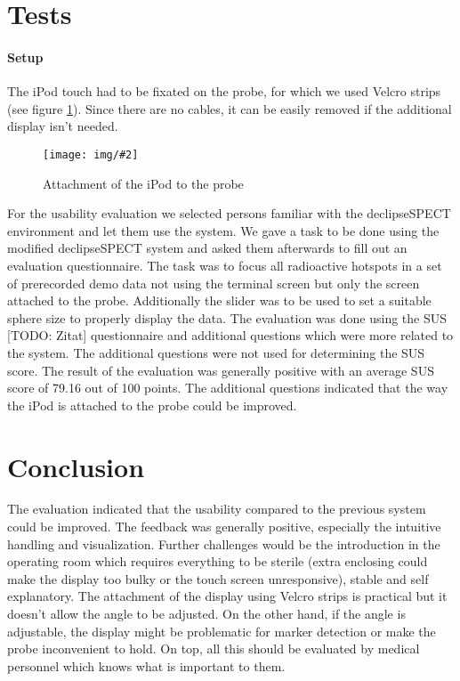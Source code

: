 \documentclass{scrartcl}
\newcommand{\graphic}[3][width=\linewidth] %
{
  \begin{figure}[h!t]
    \centering
    \texttt{[image: img/\#2]}
    \caption{#3}
    \label{fig:#2}
  \end{figure}
}
\newcommand{\refFigure}[1]{figure \ref{fig:#1}}
\begin{document}
\section{Tests}
\paragraph*{Setup}
The iPod touch had to be fixated on the probe, for which we used Velcro strips (see \refFigure{probe}). Since there are no cables, it can be easily removed if the additional display isn't needed.
\graphic[scale=.5]{probe}{Attachment of the iPod to the probe}

For the usability evaluation we selected persons familiar with the declipseSPECT environment and let them use the system. We gave a task to be done using the modified declipseSPECT system and asked them afterwards to fill out an evaluation questionnaire.
The task was to focus all radioactive hotspots in a set of prerecorded demo data not using the terminal screen but only the screen attached to the probe. Additionally the slider was to be used to set a suitable sphere size to properly display the data. The evaluation was done using the SUS [TODO: Zitat] questionnaire and additional questions which were more related to the system. The additional questions were not used for determining the SUS score.
The result of the evaluation was generally positive with an average SUS score of 79.16 out of 100 points. The additional questions indicated that the way the iPod is attached to the probe could be improved.



\section{Conclusion}
The evaluation indicated that the usability compared to the previous system could be improved. The feedback was generally positive, especially the intuitive handling and visualization.
Further challenges would be the introduction in the operating room which requires everything to be sterile (extra enclosing could make the display too bulky or the touch screen unresponsive), stable and self explanatory.
The attachment of the display using Velcro strips is practical but it doesn't allow the angle to be adjusted. On the other hand, if the angle is adjustable, the display might be problematic for marker detection or make the probe inconvenient to hold.
On top, all this should be evaluated by medical personnel which knows what is important to them.




\end{document}
